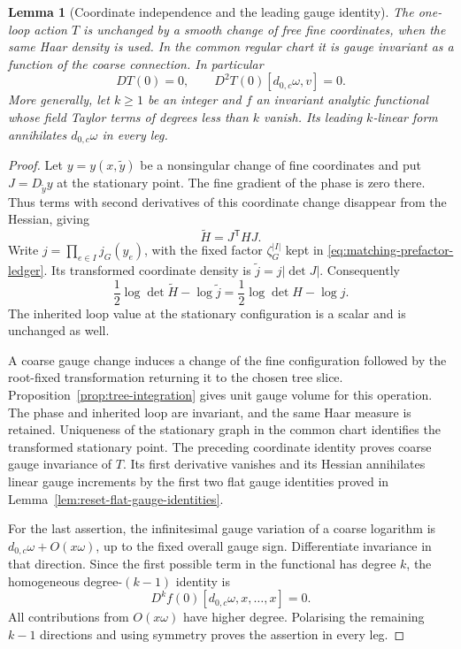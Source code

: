 \documentclass[11pt,reqno]{amsart}
\numberwithin{equation}{section}
\newtheorem{lemma}[theorem]{Lemma}
\theoremstyle{definition}
\theoremstyle{remark}
\begin{document}
\begin{lemma}[Coordinate independence and the leading gauge identity]
\label{lem:matching-gauge-jets}
The one-loop action \(T\) is unchanged by a smooth change
of free fine coordinates, when the same Haar density
is used. In the common regular chart it is gauge
invariant as a function of the coarse connection.
In particular
\[
 DT(0)=0,\qquad
             D^2T(0)[d_{0,c}\omega,v]=0.
\]
More generally, let \(k\ge1\) be an integer and \(f\) an
invariant analytic functional whose field Taylor terms of degrees less
than \(k\) vanish. Its leading \(k\)-linear form
annihilates \(d_{0,c}\omega\) in every leg.
\end{lemma}
\begin{proof}
Let \(y=y(x,\widetilde y)\) be a nonsingular change of
fine coordinates and put \(J=D_{\widetilde y}y\) at the
stationary point. The fine gradient of the phase is
zero there. Thus terms with second derivatives of this
coordinate change disappear from the Hessian, giving
\[
                    \widetilde{H}=J^{\mathsf T}HJ.
\]
Write \(j=\prod_{e\in I}j_G(y_e)\), with the fixed
factor \(\zeta_G^{|I|}\) kept in
\eqref{eq:matching-prefactor-ledger}. Its transformed
coordinate density is
\(\widetilde j=j|\det J|\). Consequently
\[
 \frac12\log\det\widetilde{H}-\log\widetilde j
                   =\frac12\log\det H-\log j.
\]
The inherited loop value at the stationary configuration
is a scalar and is unchanged as well.

A coarse gauge change induces a change of the fine
configuration followed by the root-fixed transformation
returning it to the chosen tree slice.
Proposition~\ref{prop:tree-integration} gives unit
gauge volume for this operation. The phase and inherited
loop are invariant, and the same Haar measure is
retained. Uniqueness of the stationary graph in the
common chart identifies the transformed stationary point.
The preceding coordinate identity proves coarse gauge
invariance of \(T\). Its first derivative vanishes and
its Hessian annihilates linear gauge increments by the
first two flat gauge identities proved in
Lemma~\ref{lem:reset-flat-gauge-identities}.

For the last assertion, the infinitesimal gauge variation
of a coarse logarithm is
\(d_{0,c}\omega+O(x\omega)\), up to the fixed overall
gauge sign. Differentiate invariance in that direction.
Since the first possible term in the functional has
degree \(k\), the homogeneous degree-\((k-1)\) identity
is
\[
                   D^kf(0)[d_{0,c}\omega,x,\ldots,x]=0.
\]
All contributions from \(O(x\omega)\) have higher
degree. Polarising the remaining \(k-1\) directions
and using symmetry proves the assertion in every leg.
\end{proof}
\end{document}
